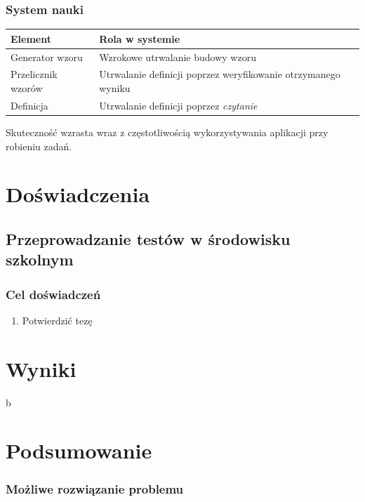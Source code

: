 \documentclass[10pt]{beamer}
\begin{document}
\begin{frame}
  \frametitle{System nauki}
  \small
  \begin{table}
    \centering
    \begin{tabular}{ p{4cm} p{5cm} }
      \toprule
      Element & Rola w systemie \\
      \midrule
      Generator wzoru & Wzrokowe utrwalanie budowy wzoru \\
      Przelicznik wzorów & Utrwalanie definicji poprzez weryfikowanie otrzymanego wyniku  \\
      Definicja & Utrwalanie definicji poprzez \textit{czytanie}\\
      \bottomrule
    \end{tabular}
  \end{table}

  Skuteczność wzrasta wraz z częstotliwością wykorzystywania aplikacji przy robieniu zadań.

\end{frame}

\section{Doświadczenia}
\subsection{Przeprowadzanie testów w środowisku szkolnym}

\begin{frame}
\frametitle{Cel doświadczeń}
\begin{enumerate}
  \item Potwierdzić tezę
\end{enumerate}
\end{frame}

\section{Wyniki}

\begin{frame}
b
\end{frame}

\section{Podsumowanie}

\begin{frame}
  \frametitle{Możliwe rozwiązanie problemu}
\end{frame}
\end{document}

